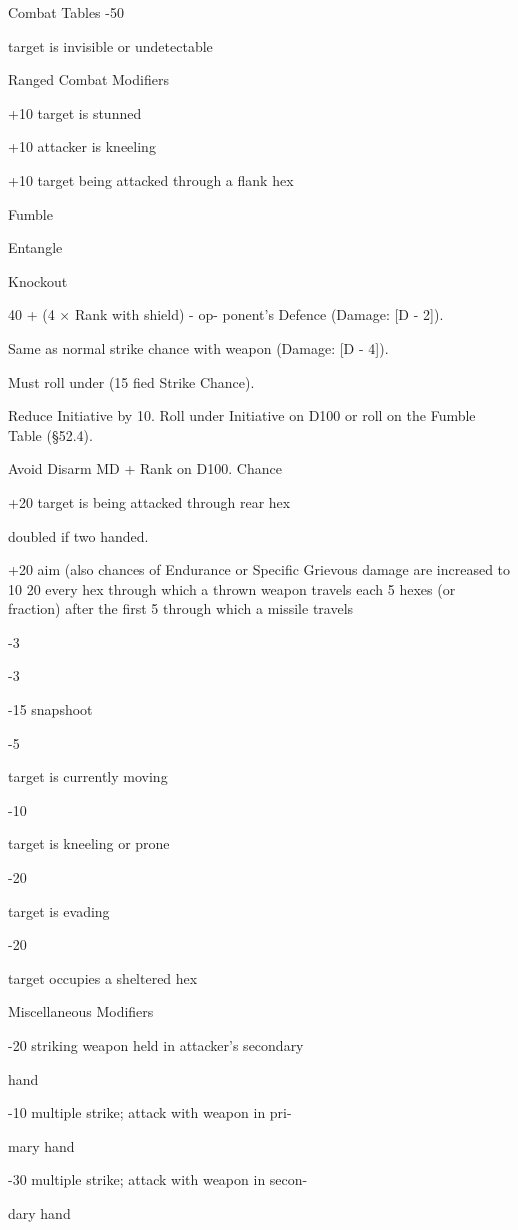 \begin{Table}{Combat Tables}
-50 

target is invisible or undetectable 

Ranged Combat Modifiers 

+10  target is stunned 

+10  attacker is kneeling 

+10  target being attacked through a flank hex 

Fumble  

Entangle  

Knockout  

40%
+ (4 × Rank with shield) - op-
ponent’s Defence (Damage: [D 
- 2]). 

Same as normal strike chance 
with weapon (Damage: [D - 4]). 

Must roll under (15%
fied Strike Chance). 

Reduce Initiative by 10. Roll 
under Initiative on D100 or roll 
on the Fumble Table (§52.4). 

Avoid Disarm   MD + Rank on D100. Chance 

+20  target is being attacked through rear hex 

doubled if two handed. 

+20  aim (also chances of Endurance or Specific 
Grievous damage are increased to 10%
20%
every hex through which a thrown weapon 
travels 
each 5 hexes (or fraction) after the first 5 
through which a missile travels 

-3 

-3 

-15  snapshoot 

-5 

target is currently moving 

-10 

target is kneeling or prone 

-20 

target is evading 

-20 

target occupies a sheltered hex 

Miscellaneous Modifiers 

-20  striking weapon held in attacker’s secondary 

hand 

-10  multiple strike; attack with weapon in pri-

mary hand 

-30  multiple strike; attack with weapon in secon-

dary hand 


\end{Table}
